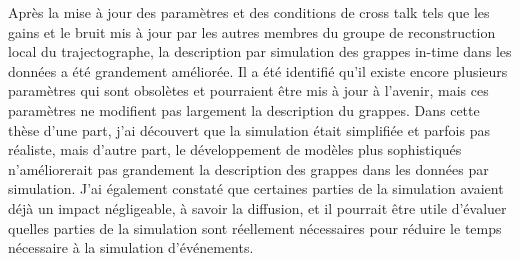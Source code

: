
Après la mise à jour des paramètres et des conditions de cross talk tels que les gains et le bruit mis à jour par les autres membres du groupe de reconstruction local du trajectographe, la description par simulation des grappes in-time dans les données a été grandement améliorée. Il a été identifié qu'il existe encore plusieurs paramètres qui sont obsolètes et pourraient être mis à jour à l'avenir, mais ces paramètres ne modifient pas largement la description du grappes. Dans cette thèse d'une part, j'ai découvert que la simulation était simplifiée et parfois pas réaliste, mais d'autre part, le développement de modèles plus sophistiqués n'améliorerait pas grandement la description des grappes dans les données par simulation. J'ai également constaté que certaines parties de la simulation avaient déjà un impact négligeable, à savoir la diffusion, et il pourrait être utile d'évaluer quelles parties de la simulation sont réellement nécessaires pour réduire le temps nécessaire à la simulation d'événements.


